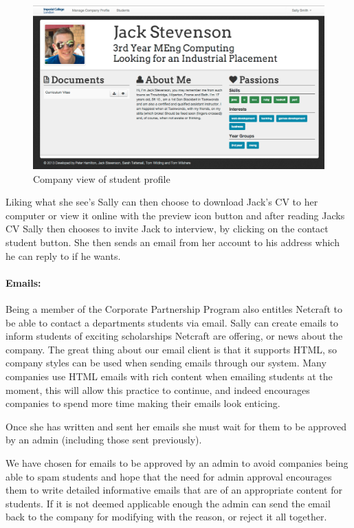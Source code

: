     \begin{figure}[H]\centering
    \includegraphics[scale=0.3]{images/user_experiences/company/jack_profile}
    \caption{Company view of student profile}
    \end{figure}

    Liking what she see's Sally can then choose to download Jack's CV to her computer or view it online with the preview icon button and after reading Jacks CV Sally then chooses to invite Jack to interview, by clicking on the contact student button. She then sends an email from her account to his address which he can reply to if he wants. 

  \paragraph{Emails:}
    Being a member of the Corporate Partnership Program also entitles Netcraft to be able to contact a departments students via email. Sally can create emails to inform students of exciting scholarships Netcraft are offering, or news about the company. The great thing about our email client is that it supports HTML, so company styles can be used when sending emails through our system. Many companies use HTML emails with rich content when emailing students at the moment, this will allow this practice to continue, and indeed encourages companies to spend more time making their emails look enticing.

    Once she has written and sent her emails she must wait for them to be approved by an admin (including those sent previously).

    We have chosen for emails to be approved by an admin to avoid companies being able to spam students and hope that the need for admin approval encourages them to write detailed informative emails that are of an appropriate content for students. If it is not deemed applicable enough the admin can send the email back to the company for modifying with the reason, or reject it all together.

